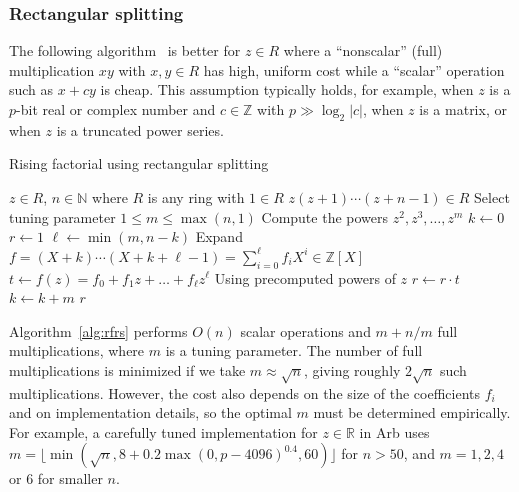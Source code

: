 \documentclass[reqno]{amsart}
\newcommand{\ZZ}{\mathbb{Z}}
\newcommand{\NN}{\mathbb{N}}
\newcommand{\RR}{\mathbb{R}}
\theoremstyle{definition}
\begin{document}
\subsubsection{Rectangular splitting}

The following algorithm~\cite{Johansson2014rectangular} is better for
$z \in R$ where a ``nonscalar'' (full) multiplication $xy$ with $x, y \in R$
has high, uniform cost while a ``scalar'' operation
such as $x + cy$ is cheap.
This assumption typically holds, for example, when
$z$ is a $p$-bit real or complex number and $c \in \ZZ$
with $p \gg \log_2 |c|$, when $z$ is a matrix,
or when $z$ is a truncated power series.

\begin{algorithm}%
\caption{Rising factorial using rectangular splitting}\label{alg:rfrs}
\small
\begin{algorithmic}[1]
\Require $z \in R$, $n \in \NN$ where $R$ is any ring with $1 \in R$
\Ensure $z (z+1) \cdots (z+n-1) \in R$
\State Select tuning parameter $1 \le m \le \max(n,1)$ %
\State Compute the powers $z^2, z^3, \ldots, z^m$
\State $k \gets 0$
\State $r \gets 1$
  \State $\ell \gets \min(m, n-k)$
  \State Expand $f = (X+k) \cdots (X+k+\ell-1) = \sum_{i=0}^{\ell} f_i X^i \in \ZZ[X]$
  \State $t \gets f(z) = f_0 + f_1 z + \ldots + f_{\ell} z^{\ell}$ \Comment Using precomputed powers of $z$
  \State $r \gets r \cdot t$
  \State $k \gets k + m$
\EndWhile
\State \Return $r$
\end{algorithmic}
\end{algorithm}

Algorithm~\ref{alg:rfrs} performs
$O(n)$ scalar operations and $m + n / m$ full multiplications,
where $m$ is a tuning parameter.
The number of full multiplications is minimized if we take $m \approx \sqrt{n}$,
giving roughly $2 \sqrt{n}$ such multiplications.
However, the cost also depends on the size of the coefficients $f_i$
and on implementation details, so the optimal $m$
must be determined empirically.
For example, a carefully tuned implementation for $z \in \RR$ in Arb uses
$m = \lfloor \min(\sqrt{n}, 8 + 0.2 \max(0, p-4096)^{0.4}, 60) \rfloor$ for $n > 50$,
and $m = 1, 2, 4$ or $6$ for smaller $n$.
\end{document}
